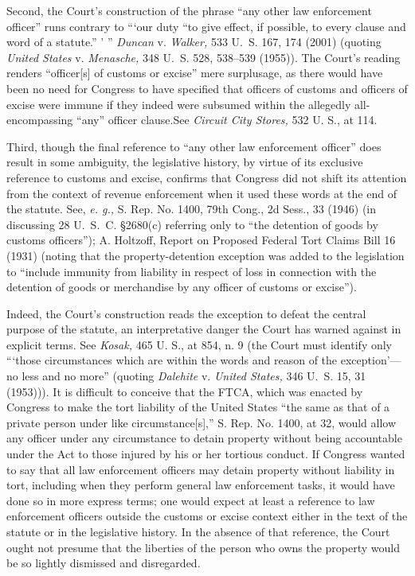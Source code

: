   Second, the Court's construction of the phrase ``any other law enforcement officer'' runs contrary to ``‘our duty ``to give effect, if possible, to every clause and word of a statute.'' ' '' \emph{Duncan} v. \emph{Walker,} 533 U.~S. 167, 174 (2001) (quoting \emph{United States} v. \emph{Menasche,} 348 U.~S. 528, 538--539 (1955)). The Court's reading renders ``officer[s] of customs or excise'' mere surplusage, as there would have been no need for Congress to have specified that officers of customs and officers of excise were immune if they indeed were subsumed within the allegedly all-encompassing ``any'' officer clause.See \emph{Circuit City Stores,} 532 U. S., at 114.\newpage 

  Third, though the final reference to ``any other law enforcement officer'' does result in some ambiguity, the legislative history, by virtue of its exclusive reference to customs and excise, confirms that Congress did not shift its attention from the context of revenue enforcement when it used these words at the end of the statute. See, \emph{e. g.,} S. Rep. No. 1400, 79th Cong., 2d Sess., 33 (1946) (in discussing 28 U.~S.~C. \S2680(c) referring only to ``the detention of goods by customs officers''); A. Holtzoff, Report on Proposed Federal Tort Claims Bill 16 (1931) (noting that the property-detention exception was added to the legislation to ``include immunity from liability in respect of loss in connection with the detention of goods or merchandise by any officer of customs or excise'').

  Indeed, the Court's construction reads the exception to defeat the central purpose of the statute, an interpretative danger the Court has warned against in explicit terms. See \emph{Kosak,} 465 U. S., at 854, n. 9 (the Court must identify only ``‘those circumstances which are within the words and reason of the exception'---no less and no more'' (quoting \emph{Dalehite} v. \emph{United States,} 346 U.~S. 15, 31 (1953))). It is difficult to conceive that the FTCA, which was enacted by Congress to make the tort liability of the United States ``the same as that of a private person under like circumstance[s],'' S. Rep. No. 1400, at 32, would allow any officer under any circumstance to detain property without being accountable under the Act to those injured by his or her tortious conduct. If Congress wanted to say that all law enforcement officers may detain property without liability in tort, including when they perform general law enforcement tasks, it would have done so in more express terms; one would expect at least a reference to law enforcement officers outside the customs or excise context either in the text of the statute or in the legislative history. In the absence of that reference, the Court ought not presume that the liberties of the person who owns the property would be so lightly dismissed and disregarded. \newpage 

